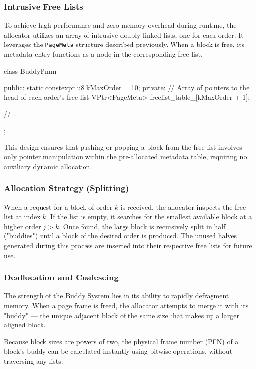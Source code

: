 \documentclass[a4paper,10pt,twoside]{report}
\theoremstyle{definition}
\begin{document}
\subsubsection{Intrusive Free Lists}

To achieve high performance and zero memory overhead during runtime, the allocator utilizes an array of intrusive doubly linked lists, one for each order. It leverages the \texttt{PageMeta} structure described previously. When a block is free, its metadata entry functions as a node in the corresponding free list.

\begin{cppcode}[caption={Buddy System State Management}, label={lst:buddy_lists}]
class BuddyPmm {
public:
    static constexpr u8 kMaxOrder = 10;
private:
    // Array of pointers to the head of each order's free list
    VPtr<PageMeta> freelist_table_[kMaxOrder + 1];
    
    // ...
};
\end{cppcode}

This design ensures that pushing or popping a block from the free list involves only pointer manipulation within the pre-allocated metadata table, requiring no auxiliary dynamic allocation.

\subsubsection{Allocation Strategy (Splitting)}

When a request for a block of order $k$ is received, the allocator inspects the free list at index $k$. If the list is empty, it searches for the smallest available block at a higher order $j > k$. Once found, the large block is recursively split in half ("buddies") until a block of the desired order is produced. The unused halves generated during this process are inserted into their respective free lists for future use.

\subsubsection{Deallocation and Coalescing}

The strength of the Buddy System lies in its ability to rapidly defragment memory. When a page frame is freed, the allocator attempts to merge it with its "buddy" --- the unique adjacent block of the same size that makes up a larger aligned block.

Because block sizes are powers of two, the physical frame number (PFN) of a block's buddy can be calculated instantly using bitwise operations, without traversing any lists.
\end{document}
